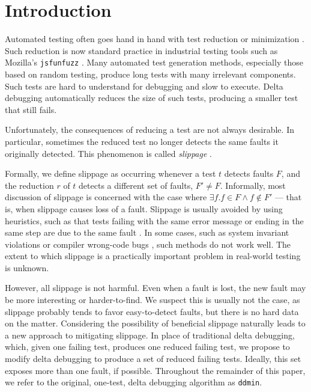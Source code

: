 \section{Introduction}

Automated testing often goes hand in hand with
test reduction or minimization \cite{DD,MinUnit,TCminim,ICSEDiff,CReduce}.
Such reduction is
now standard practice in industrial testing tools such as Mozilla's
{\tt jsfunfuzz} \cite{jsfunfuzz2}.  Many automated
test generation methods, especially those based on random testing,
produce long tests with many irrelevant components.  Such tests are
hard to understand for debugging and slow to execute.  Delta debugging
automatically reduces the size of such tests,
producing a smaller test that still fails.

Unfortunately, the consequences of reducing a test are not always
desirable.  In particular, sometimes the reduced test no longer
detects the same faults it originally detected.  This phenomenon is
called \emph{slippage} \cite{PLDI13}.  

Formally, we define slippage as occurring whenever a test $t$ detects
faults $F$, and the reduction $r$ of $t$ detects a different set of
faults, $F' \neq F$.  Informally, most discussion of slippage is
concerned with the case where
$\exists f .  f \in F \wedge f \not\in F'$ --- that is, when slippage
causes loss of a fault.  Slippage is usually avoided by using
heuristics, such as that tests failing with the same error message or
ending in the same step are due to the same fault \cite{ICSEDiff}.  In
some cases, such as system invariant violations or compiler wrong-code
bugs \cite{PLDI13}, such methods do not work well.  The extent to
which slippage is a practically important problem in real-world
testing is unknown.

However, all slippage is not
harmful.  Even when a fault is lost, the new fault may be more
interesting or harder-to-find.  We suspect this is usually not the
case, as slippage probably tends to favor easy-to-detect faults, but
there is no hard data on the matter.  Considering the
possibility of beneficial slippage naturally leads to a new approach to
mitigating slippage.  In place of traditional delta debugging, which,
given one failing test, produces one reduced failing test, we propose
to modify delta debugging to produce a set of reduced
failing tests.  Ideally, this set exposes more than one fault, if possible.
Throughout the remainder of this paper, we refer to the original,
one-test, delta debugging algorithm \cite{DD} as {\tt ddmin}.  

